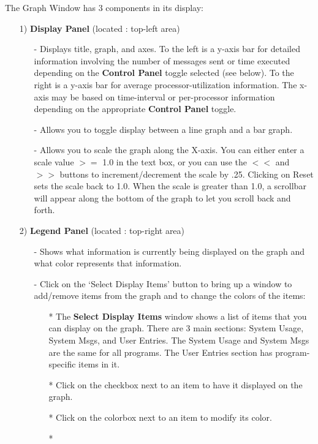 \documentclass[10pt]{article}
\begin{document}
The Graph Window has 3 components in its display:
\begin{enumerate}
\item[1)]
{\bf Display Panel} (located : top-left area)
   \begin{itemize}
   \item[-]
   Displays title, graph, and axes. To the left is a y-axis bar for
   detailed information involving the number of messages sent or time
   executed depending on the {\bf Control Panel} toggle selected (see 
   below). To the right is a y-axis bar for average processor-utilization 
   information. The x-axis may be based on time-interval or per-processor
   information depending on the appropriate {\bf Control Panel} toggle.
   \item[-]
   Allows you to toggle display between a line graph and a bar graph.
   \item[-]
   Allows you to scale the graph along the X-axis.  You can either
   enter a scale value $>=$ 1.0 in the text box, or you can use the
   $<<$ and $>>$ buttons to increment/decrement the scale by .25.
   Clicking on Reset sets the scale back to 1.0.  When the scale is
   greater than 1.0, a scrollbar will appear along the bottom of the
   graph to let you scroll back and forth.
   \end{itemize}
\item[2)]
{\bf Legend Panel} (located : top-right area)
   \begin{itemize}
   \item[-]
   Shows what information is currently being displayed on the graph and 
   what color represents that information.
   \item[-]
   Click on the `Select Display Items' button to bring up a window to
   add/remove items from the graph and to change the colors of the items:
      \begin{itemize}
      \item[*]
      The {\bf Select Display Items} window shows a list of items that you
      can display on the graph.  There are 3 main sections: System
      Usage, System Msgs, and User Entries. The System Usage and System
      Msgs are the same for all programs. The User Entries section
      has program-specific items in it.
      \item[*]
      Click on the checkbox next to an item to have it displayed on the
      graph.
      \item[*]
      Click on the colorbox next to an item to modify its color.
      \item[*]

\end{itemize}
\end{itemize}
\end{enumerate}
\end{document}
